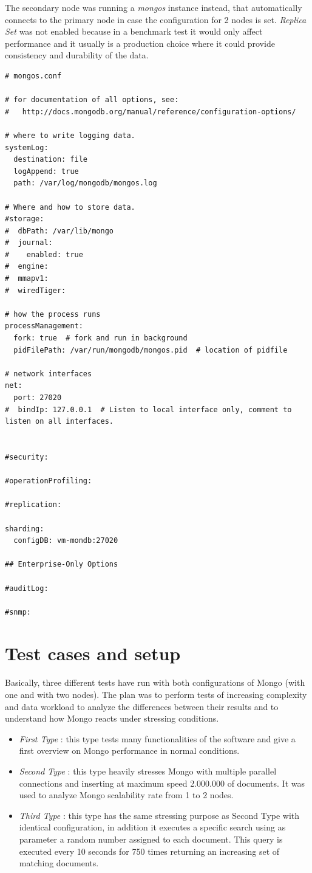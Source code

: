 The secondary node was running a \textit{mongos} instance instead, that automatically connects to the primary node in case the configuration for 2 nodes is set. \textit{Replica Set} was not enabled because in a benchmark test it would only affect performance and it usually is a production choice where it could provide consistency and durability of the data.
\begin{lstlisting}
# mongos.conf

# for documentation of all options, see:
#   http://docs.mongodb.org/manual/reference/configuration-options/

# where to write logging data.
systemLog:
  destination: file
  logAppend: true
  path: /var/log/mongodb/mongos.log

# Where and how to store data.
#storage:
#  dbPath: /var/lib/mongo
#  journal:
#    enabled: true
#  engine:
#  mmapv1:
#  wiredTiger:

# how the process runs
processManagement:
  fork: true  # fork and run in background
  pidFilePath: /var/run/mongodb/mongos.pid  # location of pidfile

# network interfaces
net:
  port: 27020
#  bindIp: 127.0.0.1  # Listen to local interface only, comment to listen on all interfaces.


#security:

#operationProfiling:

#replication:

sharding:
  configDB: vm-mondb:27020

## Enterprise-Only Options

#auditLog:

#snmp:
\end{lstlisting}

 
\section{Test cases and setup}
\label{sec:2}
Basically, three different tests have run with both configurations of Mongo (with one and with two nodes). 
The plan was to perform tests of increasing complexity and data workload to analyze the differences between their results and to  understand how Mongo reacts under stressing conditions.
\begin{itemize}
	\item \textit{First Type} : this type tests many functionalities of the software and  give a first overview on Mongo performance in normal conditions.
	\item \textit{Second Type} : this type heavily stresses Mongo with multiple parallel connections and inserting at maximum speed 2.000.000 of documents. It was used to analyze Mongo scalability rate from 1 to 2 nodes.
	\item \textit{Third Type} : this type has the same stressing purpose as Second Type with identical configuration, in addition it executes a specific search using as parameter a random number assigned to each document. This query is executed every 10 seconds for 750 times returning an increasing set of matching documents.
\end{itemize}



